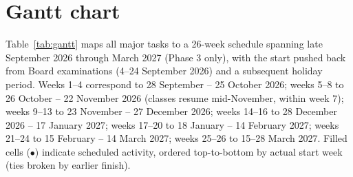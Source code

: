 \section*{Gantt chart}
Table~\ref{tab:gantt} maps all major tasks to a 26-week schedule spanning late September 2026 through March 2027 (Phase 3 only), with the start pushed back from Board examinations (4--24 September 2026) and a subsequent holiday period. Weeks 1--4 correspond to 28 September -- 25 October 2026; weeks 5--8 to 26 October -- 22 November 2026 (classes resume mid-November, within week 7); weeks 9--13 to 23 November -- 27 December 2026; weeks 14--16 to 28 December 2026 -- 17 January 2027; weeks 17--20 to 18 January -- 14 February 2027; weeks 21--24 to 15 February -- 14 March 2027; weeks 25--26 to 15--28 March 2027. Filled cells ($\bullet$) indicate scheduled activity, ordered top-to-bottom by actual start week (ties broken by earlier finish).

